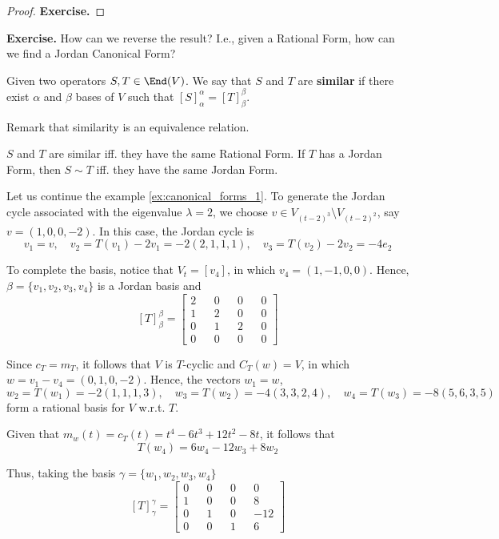 \begin{proof}
	\textbf{Exercise.}
\end{proof}

\textbf{Exercise.} How can we reverse the result? I.e., given a Rational Form, how can we find a Jordan Canonical Form?

\begin{definition}
	Given two operators $S, T \in \End(V)$. We say that $S$ and $T$ are \textbf{similar} if there exist $\alpha$ and $\beta$ bases of $V$ such that $[S]_\alpha^\alpha = [T]_\beta^\beta$.
\end{definition}

Remark that similarity is an equivalence relation.

\begin{theorem}
	$S$ and $T$ are similar iff. they have the same Rational Form. If $T$ has a Jordan Form, then $S \sim T$ iff. they have the same Jordan Form.
\end{theorem}

\begin{example}
	Let us continue the example \ref{ex:canonical_forms_1}. To generate the Jordan cycle associated with the eigenvalue $\lambda = 2$, we choose $v \in V_{(t-2)^3} \setminus V_{(t-2)^2}$, say $v = (1, 0, 0, -2)$. In this case, the Jordan cycle is
	\[
		v_1 = v, \quad v_2 = T(v_1) - 2v_1 = -2(2,1,1,1), \quad v_3 = T(v_2) - 2v_2 = -4 e_2
	\]
	
	To complete the basis, notice that $V_t = [v_4]$, in which $v_4 = (1, -1, 0, 0)$. Hence, $\beta = \{ v_1, v_2, v_3, v_4 \}$ is a Jordan basis and 
	\[
		[T]_\beta^\beta = \begin{bmatrix}
			2 && 0 && 0 && 0 \\
			1 && 2 && 0 && 0 \\
			0 && 1 && 2 && 0 \\
			0 && 0 && 0 && 0
		\end{bmatrix}
	\]
	
	Since $c_T = m_T$, it follows that $V$ is $T$-cyclic and $C_T(w) = V$, in which $w = v_1 - v_4 = (0, 1, 0, -2)$. Hence, the vectors $w_1 = w$,
	\[
		w_2 = T(w_1) = -2(1,1,1,3), \quad w_3 = T(w_2) = -4(3,3,2,4), \quad w_4 = T(w_3) = -8(5,6,3,5)
	\]
	form a rational basis for $V$ w.r.t. $T$.
	
	Given that $m_w(t) = c_T(t) = t^4 - 6t^3 + 12t^2 -8t$, it follows that
	\[
		T(w_4) = 6w_4 - 12 w_3 + 8 w_2
	\]
	
	Thus, taking the basis $\gamma = \{ w_1, w_2, w_3, w_4 \}$
	\[
		[T]_\gamma^\gamma = \begin{bmatrix}
			0 && 0 && 0 && 0 \\
			1 && 0 && 0 && 8 \\
			0 && 1 && 0 && -12 \\
			0 && 0 && 1 && 6
		\end{bmatrix}
	\]
\end{example}

